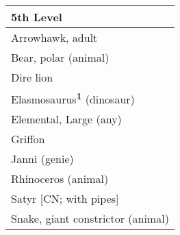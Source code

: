\begin{longtable}{ll}
\hline
\multicolumn{2}{|p{3.857in}|}{\begin{minipage}[t]{3.857in}\raggedright
\textbf{5th Level}\end{minipage}}\\
\hline
\multicolumn{2}{|p{3.857in}|}{\begin{minipage}[t]{3.857in}\raggedright
Arrowhawk, adult\end{minipage}}\\
\hline
\multicolumn{2}{|p{3.857in}|}{\begin{minipage}[t]{3.857in}\raggedright
Bear, polar (animal)\end{minipage}}\\
\hline
\multicolumn{2}{|p{3.857in}|}{\begin{minipage}[t]{3.857in}\raggedright
Dire lion\end{minipage}}\\
\hline
\multicolumn{2}{|p{3.857in}|}{\begin{minipage}[t]{3.857in}\raggedright
Elasmosaurus\textsuperscript{\textbf{1}}\textbf{} (dinosaur)\end{minipage}}\\
\hline
\multicolumn{2}{|p{3.857in}|}{\begin{minipage}[t]{3.857in}\raggedright
Elemental, Large (any)\end{minipage}}\\
\hline
\multicolumn{2}{|p{3.857in}|}{\begin{minipage}[t]{3.857in}\raggedright
Griffon\end{minipage}}\\
\hline
\multicolumn{2}{|p{3.857in}|}{\begin{minipage}[t]{3.857in}\raggedright
Janni (genie)\end{minipage}}\\
\hline
\multicolumn{2}{|p{3.857in}|}{\begin{minipage}[t]{3.857in}\raggedright
Rhinoceros (animal)\end{minipage}}\\
\hline
\multicolumn{2}{|p{3.857in}|}{\begin{minipage}[t]{3.857in}\raggedright
Satyr [CN; with pipes]\end{minipage}}\\
\hline
\multicolumn{2}{|p{3.857in}|}{\begin{minipage}[t]{3.857in}\raggedright
Snake, giant constrictor (animal)\end{minipage}}\\

\end{longtable}
